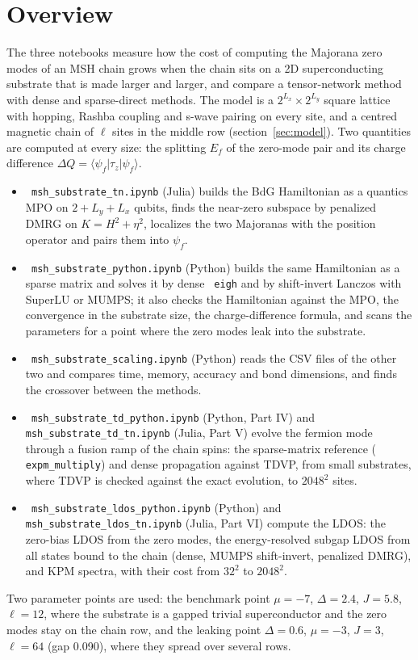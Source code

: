 \documentclass[11pt]{article}
\renewcommand{\code}[1]{\texttt{\hyphenchar\font=-1 #1}}
\newcommand{\ket}[1]{|#1\rangle}
\newcommand{\bra}[1]{\langle#1|}
\begin{document}
\section{Overview}

The three notebooks measure how the cost of computing the Majorana zero modes of an MSH chain grows when the chain sits on a 2D
superconducting substrate that is made larger and larger, and compare a tensor-network method with dense and sparse-direct methods.
The model is a $2^{L_x}\times2^{L_y}$ square lattice with hopping, Rashba coupling and s-wave pairing on every site, and a centred magnetic
chain of $\ell$ sites in the middle row (section~\ref{sec:model}). Two quantities are computed at every size: the splitting $E_f$ of the
zero-mode pair and its charge difference $\Delta Q = \bra{\psi_f}\tau_z\ket{\psi_f}$.

\begin{itemize}
\item \code{msh\_substrate\_tn.ipynb} (Julia) builds the BdG Hamiltonian as a quantics MPO on $2+L_y+L_x$ qubits, finds the near-zero subspace
  by penalized DMRG on $K = H^2+\eta^2$, localizes the two Majoranas with the position operator and pairs them into $\psi_f$.
\item \code{msh\_substrate\_python.ipynb} (Python) builds the same Hamiltonian as a sparse matrix and solves it by dense \code{eigh} and by
  shift-invert Lanczos with SuperLU or MUMPS; it also checks the Hamiltonian against the MPO, the convergence in the substrate size, the
  charge-difference formula, and scans the parameters for a point where the zero modes leak into the substrate.
\item \code{msh\_substrate\_scaling.ipynb} (Python) reads the CSV files of the other two and compares time, memory, accuracy and bond
  dimensions, and finds the crossover between the methods.
\item \code{msh\_substrate\_td\_python.ipynb} (Python, Part IV) and \code{msh\_substrate\_td\_tn.ipynb} (Julia, Part V) evolve the fermion mode
  through a fusion ramp of the chain spins: the sparse-matrix reference (\code{expm\_multiply}) and dense propagation against TDVP, from small
  substrates, where TDVP is checked against the exact evolution, to $2048^2$ sites.
\item \code{msh\_substrate\_ldos\_python.ipynb} (Python) and \code{msh\_substrate\_ldos\_tn.ipynb} (Julia, Part VI) compute the LDOS: the zero-bias
  LDOS from the zero modes, the energy-resolved subgap LDOS from all states bound to the chain (dense, MUMPS shift-invert, penalized DMRG),
  and KPM spectra, with their cost from $32^2$ to $2048^2$.
\end{itemize}
Two parameter points are used: the benchmark point $\mu = -7$, $\Delta = 2.4$, $J = 5.8$, $\ell = 12$, where the substrate is a gapped
trivial superconductor and the zero modes stay on the chain row, and the leaking point $\Delta = 0.6$, $\mu = -3$, $J = 3$, $\ell = 64$
(gap 0.090), where they spread over several rows.
\end{document}
